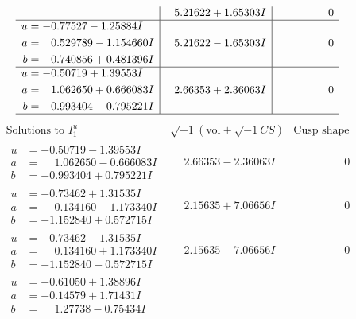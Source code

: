 \documentclass[1p]{elsarticle_modified}
\theoremstyle{definition}
\newcommand{\I}{\sqrt{-1}}
\begin{document}
$$\begin{array}{c|c|c}
 & \phantom{-}5.21622 + 1.65303 I & \phantom{-0.000000 } 0 \\ \hline\begin{aligned}
u &= -0.77527 - 1.25884 I \\
a &= \phantom{-}0.529789 - 1.154660 I \\
b &= \phantom{-}0.740856 + 0.481396 I\end{aligned}
 & \phantom{-}5.21622 - 1.65303 I & \phantom{-0.000000 } 0 \\ \hline\begin{aligned}
u &= -0.50719 + 1.39553 I \\
a &= \phantom{-}1.062650 + 0.666083 I \\
b &= -0.993404 - 0.795221 I\end{aligned}
 & \phantom{-}2.66353 + 2.36063 I & \phantom{-0.000000 } 0\\
 \hline 
 \end{array}$$\newpage$$\begin{array}{c|c|c}  
\text{Solutions to }I^u_{1}& \I (\text{vol} + \sqrt{-1}CS) & \text{Cusp shape}\\
 \hline 
\begin{aligned}
u &= -0.50719 - 1.39553 I \\
a &= \phantom{-}1.062650 - 0.666083 I \\
b &= -0.993404 + 0.795221 I\end{aligned}
 & \phantom{-}2.66353 - 2.36063 I & \phantom{-0.000000 } 0 \\ \hline\begin{aligned}
u &= -0.73462 + 1.31535 I \\
a &= \phantom{-}0.134160 - 1.173340 I \\
b &= -1.152840 + 0.572715 I\end{aligned}
 & \phantom{-}2.15635 + 7.06656 I & \phantom{-0.000000 } 0 \\ \hline\begin{aligned}
u &= -0.73462 - 1.31535 I \\
a &= \phantom{-}0.134160 + 1.173340 I \\
b &= -1.152840 - 0.572715 I\end{aligned}
 & \phantom{-}2.15635 - 7.06656 I & \phantom{-0.000000 } 0 \\ \hline\begin{aligned}
u &= -0.61050 + 1.38896 I \\
a &= -0.14579 + 1.71431 I \\
b &= \phantom{-}1.27738 - 0.75434 I\end{aligned}

\end{array}$$
\end{document}
